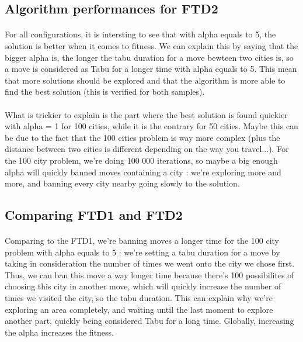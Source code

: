 \documentclass[12pt,oneside,a4paper]{article}
\begin{document}
\newpage
\subsection{Algorithm performances for FTD2}
\paragraph{}
For all configurations, it is intersting to see that with alpha equals to 5, the solution is better when it comes to fitness. We can explain this by saying that the bigger alpha is, the longer
   the tabu duration for a move bewteen two cities is,
   so a move is considered as Tabu for a longer time with alpha equals to 5. This mean that more solutions should be explored
   and that the algorithm is more able to find the best solution (this is verified for both samples).
\paragraph{}
   What is trickier to explain is the part where the best solution is found quickier with alpha = 1 for 100 cities, while it is
   the contrary for 50 cities. Maybe this can be due to the fact that the 100 cities problem is way more complex (plus the distance
   between two cities is different depending on the way you travel...). For the 100 city problem, we’re doing 100 000 iterations,
    so maybe a big enough alpha will quickly banned moves containing a city : we’re exploring more and more, and banning every city nearby
    going slowly to the solution.

\subsection{Comparing FTD1 and FTD2}
\paragraph{}
    Comparing to the FTD1, we’re banning moves a longer time for the 100 city problem with alpha equals
    to 5 : we’re setting a tabu duration for a move by taking in consideration the number of times
    we went onto the city we chose first. Thus, we can ban this move a way longer time because there’s 100
    possibilites of choosing this city in another move,
    which will quickly increase the number of times we visited the city, so the tabu duration.
    This can explain why we’re exploring an area completely, and waiting until the last moment to
    explore another part, quickly being considered Tabu for a long time.
    Globally, increasing the alpha increases the fitness.
\end{document}
